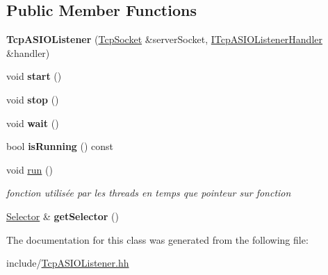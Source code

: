 \subsection*{Public Member Functions}
\begin{DoxyCompactItemize}
\item 
\hypertarget{classmognetwork_1_1_tcp_a_s_i_o_listener_ac5eb8883634b44147094fcdb3d4a95c0}{{\bfseries Tcp\-A\-S\-I\-O\-Listener} (\hyperlink{classmognetwork_1_1_tcp_socket}{Tcp\-Socket} \&server\-Socket, \hyperlink{classmognetwork_1_1_i_tcp_a_s_i_o_listener_handler}{I\-Tcp\-A\-S\-I\-O\-Listener\-Handler} \&handler)}\label{classmognetwork_1_1_tcp_a_s_i_o_listener_ac5eb8883634b44147094fcdb3d4a95c0}

\item 
\hypertarget{classmognetwork_1_1_tcp_a_s_i_o_listener_afd805699dfe27ceb0541feeefacc13dc}{void {\bfseries start} ()}\label{classmognetwork_1_1_tcp_a_s_i_o_listener_afd805699dfe27ceb0541feeefacc13dc}

\item 
\hypertarget{classmognetwork_1_1_tcp_a_s_i_o_listener_ac9952961dce0f44bc720485a4e4e620d}{void {\bfseries stop} ()}\label{classmognetwork_1_1_tcp_a_s_i_o_listener_ac9952961dce0f44bc720485a4e4e620d}

\item 
\hypertarget{classmognetwork_1_1_tcp_a_s_i_o_listener_ae6327f6471291ba5107c0a9c3362b929}{void {\bfseries wait} ()}\label{classmognetwork_1_1_tcp_a_s_i_o_listener_ae6327f6471291ba5107c0a9c3362b929}

\item 
\hypertarget{classmognetwork_1_1_tcp_a_s_i_o_listener_a431eb0fb3fab8042a9ef0b79d706fffc}{bool {\bfseries is\-Running} () const }\label{classmognetwork_1_1_tcp_a_s_i_o_listener_a431eb0fb3fab8042a9ef0b79d706fffc}

\item 
\hypertarget{classmognetwork_1_1_tcp_a_s_i_o_listener_a445dcd4bf6dfe75c7715af0fecf9494d}{void \hyperlink{classmognetwork_1_1_tcp_a_s_i_o_listener_a445dcd4bf6dfe75c7715af0fecf9494d}{run} ()}\label{classmognetwork_1_1_tcp_a_s_i_o_listener_a445dcd4bf6dfe75c7715af0fecf9494d}

\begin{DoxyCompactList}\small\item\em fonction utilisée par les threads en temps que pointeur sur fonction \end{DoxyCompactList}\item 
\hypertarget{classmognetwork_1_1_tcp_a_s_i_o_listener_aed4473511088d8bc91ce118334eed24d}{\hyperlink{classmognetwork_1_1_selector}{Selector} \& {\bfseries get\-Selector} ()}\label{classmognetwork_1_1_tcp_a_s_i_o_listener_aed4473511088d8bc91ce118334eed24d}

\end{DoxyCompactItemize}


The documentation for this class was generated from the following file\-:\begin{DoxyCompactItemize}
\item 
include/\hyperlink{_tcp_a_s_i_o_listener_8hh}{Tcp\-A\-S\-I\-O\-Listener.\-hh}\end{DoxyCompactItemize}
